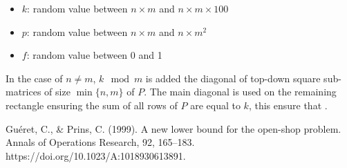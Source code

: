 \documentclass[11pt]{article}
\begin{document}
\begin{itemize}
    \item $k$: random value between $ n \times m$ and $n \times m \times 100 $
    \item $p$: random value between $ n \times m$ and $ n \times m^{2} $
    \item $f$: random value between 0 and 1
\end{itemize}


In the case of $n \neq m$, $k \mod m$ is added the diagonal of top-down square sub-matrices of size $\min\{n,m\}$ of $P$. The main diagonal is used on the remaining rectangle ensuring the sum of all rows of $P$ are equal to $k$, this ensure that . 

\begin{thebibliography}{1}
     Guéret, C., \& Prins, C. (1999). A new lower bound for the open-shop problem. Annals of Operations Research, 92, 165–183. https://doi.org/10.1023/A:1018930613891.

\end{thebibliography}
\end{document}

